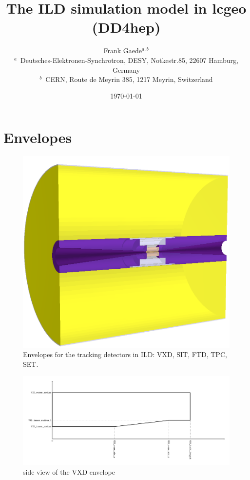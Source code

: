 \documentclass[a4paper]{article}
\title{The ILD simulation model in lcgeo (DD4hep) }
\author{Frank Gaede$^{a,b}$ \\ %
  \footnotesize
  $^a$~Deutsches-Elektronen-Synchrotron, DESY, Notkestr.85, 22607 Hamburg, Germany\\
  $^b$~CERN, Route de Meyrin 385, 1217 Meyrin, Switzerland
}
\date{\today}
\begin{document}
\maketitle



\tableofcontents 



\section{Envelopes}

\begin{figure}[th]
  \centering
  \includegraphics[width=\columnwidth]{tracking_envelopes}
  \caption{Envelopes for the tracking detectors in ILD: VXD, SIT, FTD, TPC, SET.}
  \label{ild:fig:trk_envelopes}
\end{figure}




\begin{figure}[th]
  \centering
  \includegraphics[width=1.3\columnwidth]{VXD_rz_envelope}
  \caption{side view of the VXD envelope}
  \label{ild:fig:vxd_env_rz}
\end{figure}
\end{document}
